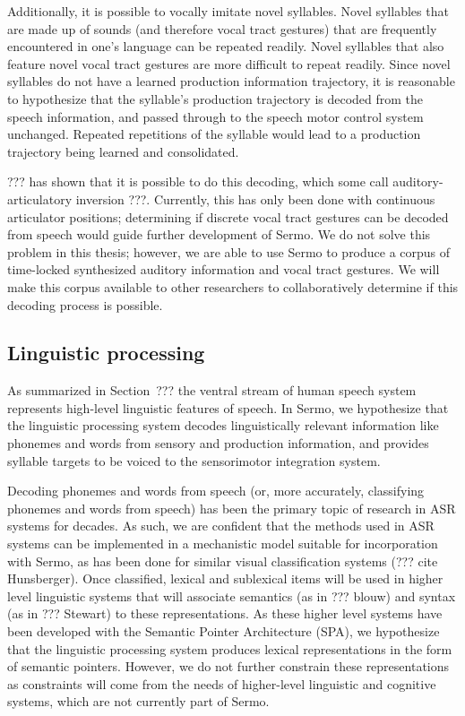Additionally,
it is possible to vocally imitate
novel syllables.
Novel syllables that are made up of sounds
(and therefore vocal tract gestures)
that are frequently encountered
in one's language can be
repeated readily.
Novel syllables that also feature
novel vocal tract gestures
are more difficult to repeat readily.
Since novel syllables do not have
a learned production information trajectory,
it is reasonable to hypothesize that
the syllable's production trajectory
is decoded from the speech information,
and passed through to the
speech motor control system unchanged.
Repeated repetitions of the syllable
would lead to a production trajectory
being learned and consolidated.

??? has shown that it is possible to
do this decoding,
which some call auditory-articulatory inversion ???.
Currently, this has only been done
with continuous articulator positions;
determining if discrete vocal tract gestures
can be decoded from speech
would guide further development of Sermo.
We do not solve this problem
in this thesis;
however, we are able to use Sermo
to produce a corpus of time-locked
synthesized auditory information
and vocal tract gestures.
We will make this corpus available
to other researchers
to collaboratively determine
if this decoding process is possible.

\subsection{Linguistic processing}

As summarized in Section~???
the ventral stream of human speech system
represents high-level linguistic features of speech.
In Sermo, we hypothesize that
the linguistic processing system
decodes linguistically relevant information
like phonemes and words
from sensory and production information,
and provides syllable targets
to be voiced to the sensorimotor integration system.

Decoding phonemes and words from speech
(or, more accurately,
classifying phonemes and words from speech)
has been the primary topic of research
in ASR systems for decades.
As such, we are confident that
the methods used in ASR systems
can be implemented in a mechanistic model
suitable for incorporation with Sermo,
as has been done for similar
visual classification systems
(??? cite Hunsberger).
Once classified, lexical and sublexical items
will be used in higher level linguistic
systems that will associate
semantics (as in ??? blouw)
and syntax (as in ??? Stewart)
to these representations.
As these higher level systems
have been developed with
the Semantic Pointer Architecture (SPA),
we hypothesize that the linguistic processing system
produces lexical representations
in the form of semantic pointers.
However, we do not further constrain these representations
as constraints will come from the needs of
higher-level linguistic and cognitive systems,
which are not currently part of Sermo.

